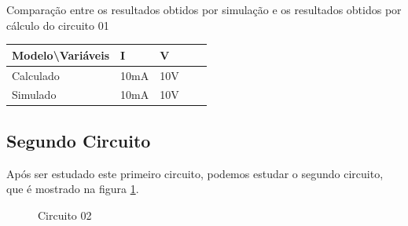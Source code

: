 \begin{quadro}[H]
    \centering
    \caption{Comparação entre os resultados obtidos por simulação e os resultados obtidos por cálculo do circuito 01}
    \begin{tabular}{|C{0.34\textwidth}|C{0.19\textwidth}|C{0.19\textwidth}|C{0.19\textwidth}|C{0.19\textwidth}|}
        \hline
        \textbf{Modelo\textbackslash{}Variáveis} & \textbf{I} & \textbf{V}\\
        \hline
        Calculado & 10mA & 10V \\
        \hline
        Simulado & 10mA & 10V \\
        \hline
    \end{tabular}
    \vspace{-0.6cm}
    \label{tab:Comparacao1Circuito}
\end{quadro}

\subsection{Segundo Circuito}

Após ser estudado este primeiro circuito, podemos estudar o segundo circuito, que é mostrado na figura \ref{fig:ex_diodo_ideal_02}.

\begin{figure}[H]
    \centering
    \caption{Circuito 02}
    \vspace{-0.3cm}
    \label{fig:ex_diodo_ideal_02}
\end{figure}

\begin{Resolucao}[H]
    \label{res:Circuito01}
\end{Resolucao}

